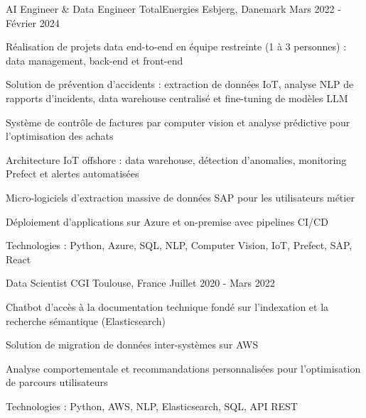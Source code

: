 \begin{cventries}
\vspace{1.5em}


\cventry
{AI Engineer \& Data Engineer} %
{TotalEnergies} %
{Esbjerg, Danemark} %
{Mars 2022 - Février 2024} %
{ %
\begin{cvitems}
\item {Réalisation de projets data end-to-end en équipe restreinte (1 à 3 personnes) : data management, back-end et front-end}
\item {Solution de prévention d'accidents : extraction de données IoT, analyse NLP de rapports d'incidents, data warehouse centralisé et fine-tuning de modèles LLM}
\item {Système de contrôle de factures par computer vision et analyse prédictive pour l'optimisation des achats}
\item {Architecture IoT offshore : data warehouse, détection d'anomalies, monitoring Prefect et alertes automatisées}
\item {Micro-logiciels d'extraction massive de données SAP pour les utilisateurs métier}
\item {Déploiement d'applications sur Azure et on-premise avec pipelines CI/CD}
\item {Technologies : Python, Azure, SQL, NLP, Computer Vision, IoT, Prefect, SAP, React}
\end{cvitems}
}
\vspace{1.5em}


\cventry
{Data Scientist} %
{CGI} %
{Toulouse, France} %
{Juillet 2020 - Mars 2022} %
{ %
\begin{cvitems}
\item {Chatbot d'accès à la documentation technique fondé sur l'indexation et la recherche sémantique (Elasticsearch)}
\item {Solution de migration de données inter-systèmes sur AWS}
\item {Analyse comportementale et recommandations personnalisées pour l'optimisation de parcours utilisateurs}
\item {Technologies : Python, AWS, NLP, Elasticsearch, SQL, API REST}
\end{cvitems}
}


\end{cventries}
